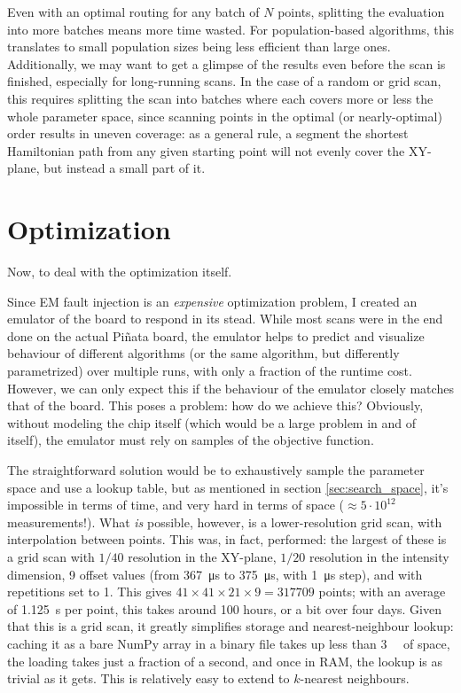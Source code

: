 \documentclass[times, utf8, diplomski]{fer}
\begin{document}
Even with an optimal routing for any batch of $N$ points, splitting the
evaluation into more batches means more time wasted. For population-based
algorithms, this translates to small population sizes being less efficient
than large ones. Additionally, we may want to get a glimpse of the results
even before the scan is finished, especially for long-running scans. In the
case of a random or grid scan, this requires splitting the scan into batches
where each covers more or less the whole parameter space, since scanning points
in the optimal (or nearly-optimal) order results in uneven coverage: as a
general rule, a segment the shortest Hamiltonian path from any given starting
point will not evenly cover the XY-plane, but instead a small part of it.





\chapter{Optimization}\label{ch:optimization}
Now, to deal with the optimization itself.

Since EM fault injection is an \emph{expensive} optimization problem, I created
an emulator of the board to respond in its stead. While most scans were in the
end done on the actual Piñata board, the emulator helps to predict and visualize
behaviour of different algorithms (or the same algorithm, but differently
parametrized) over multiple runs, with only a fraction of the runtime cost.
However, we can only expect this if the behaviour of the emulator closely
matches that of the board. This poses a problem: how do we achieve this?
Obviously, without modeling the chip itself (which would be a large problem
in and of itself), the emulator must rely on samples of the objective function.

The straightforward solution would be to exhaustively sample the parameter space
and use a lookup table, but as mentioned in section \ref{sec:search_space}, it's
impossible in terms of time, and very hard in terms of space ($\approx 5 \cdot
10^{12}$ measurements!). What \emph{is} possible, however, is a lower-resolution
grid scan, with interpolation between points. This was, in fact, performed: the
largest of these is a grid scan with $1/40$ resolution in the XY-plane, $1/20$
resolution in the intensity dimension, 9 offset values (from \SI{367}{\micro\second}
to \SI{375}{\micro\second}, with \SI{1}{\micro\second} step), and with repetitions
set to 1. This gives $41 \times 41 \times 21 \times 9 = 317709$ points; with an
average of \SI{1.125}{\second} per point, this takes around 100 hours, or a bit
over four days. Given that this is a grid scan, it greatly simplifies storage
and nearest-neighbour lookup: caching it as a bare NumPy array in a binary file
takes up less than \SI{3}{\mebi\byte} of space, the loading takes just a
fraction of a second, and once in RAM, the lookup is as trivial as it gets.
This is relatively easy to extend to $k$-nearest neighbours.
\end{document}
